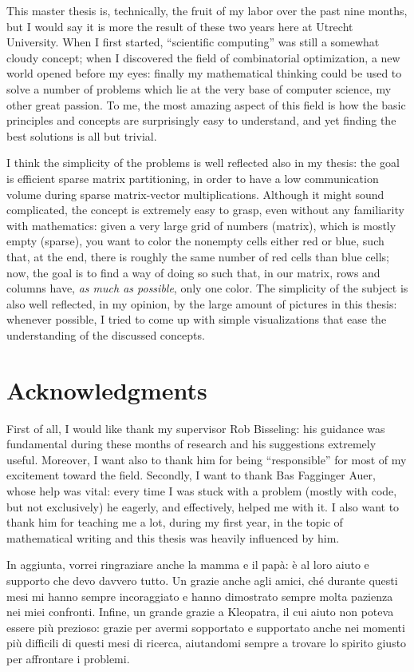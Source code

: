 This master thesis is, technically, the fruit of my labor over the past nine months, but I would say it is more the result of these two years here at Utrecht University. When I first started, ``scientific computing'' was still a somewhat cloudy concept; when I discovered the field of combinatorial optimization, a new world opened before my eyes: finally my mathematical thinking could be used to solve a number of problems which lie at the very base of computer science, my other great passion. To me, the most amazing aspect of this field is how the basic principles and concepts are surprisingly easy to understand, and yet finding the best solutions is all but trivial. 

I think the simplicity of the problems is well reflected also in my thesis: the goal is efficient sparse matrix partitioning, in order to have a low communication volume during sparse matrix-vector multiplications. Although it might sound complicated, the concept is extremely easy to grasp, even without any familiarity with mathematics: given a very large grid of numbers (matrix), which is mostly empty (sparse), you want to color the nonempty cells either red or blue, such that, at the end, there is roughly the same number of red cells than blue cells; now, the goal is to find a way of doing so such that, in our matrix, rows and columns have, \emph{as much as possible}, only one color. The simplicity of the subject is also well reflected, in my opinion, by the large amount of pictures in this thesis: whenever possible, I tried to come up with simple visualizations that ease the understanding of the discussed concepts.

\section*{Acknowledgments}

First of all, I would like thank my supervisor Rob Bisseling: his guidance was fundamental during these months of research and his suggestions extremely useful. Moreover, I want also to thank him for being ``responsible'' for most of my excitement toward the field. Secondly, I want to thank Bas Fagginger Auer, whose help was vital: every time I was stuck with a problem (mostly with code, but not exclusively) he eagerly, and effectively, helped me with it. I also want to thank him for teaching me a lot, during my first year, in the topic of mathematical writing and this thesis was heavily influenced by him.

In aggiunta, vorrei ringraziare anche la mamma e il papà: è al loro aiuto e supporto che devo davvero tutto. Un grazie anche agli amici, ch\'{e} durante questi mesi mi hanno sempre incoraggiato e hanno dimostrato sempre molta pazienza nei miei confronti. Infine, un grande grazie a Kleopatra, il cui aiuto non poteva essere più prezioso: grazie per avermi sopportato e supportato anche nei momenti più difficili di questi mesi di ricerca, aiutandomi sempre a trovare lo spirito giusto per affrontare i problemi.

